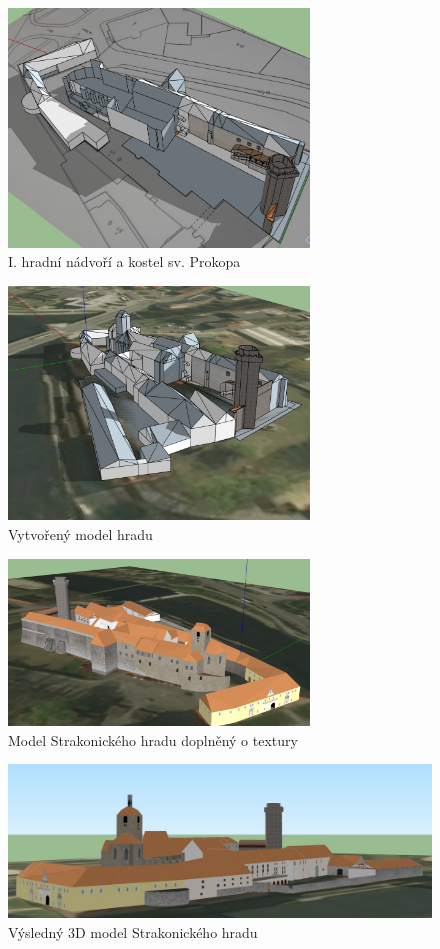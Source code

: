 \documentclass[thesis=M,czech]{FITthesis}[2012/06/26]
\begin{document}
\begin{figure}[h]
	\centering
	\includegraphics[width=8cm]{pics/sketchup3.png}
	\caption{I. hradní nádvoří a kostel sv. Prokopa}
	\label{obrazek:sk3}
\end{figure}

\begin{figure}[h]
	\centering
	\includegraphics[width=8cm]{pics/sketchup4.png}
	\caption{Vytvořený model hradu}
	\label{obrazek:sk4}
\end{figure}

\begin{figure}[h]
	\centering
	\includegraphics[width=8cm]{pics/sketchup5.png}
	\caption{Model Strakonického hradu doplněný o textury}
	\label{obrazek:sk5}
\end{figure}

\begin{figure}[h]
	\centering
	\includegraphics[width=13cm]{pics/final_model.jpg}
	\caption{Výsledný 3D model Strakonického hradu}
	\label{obrazek:sk6}
\end{figure}
\end{document}
